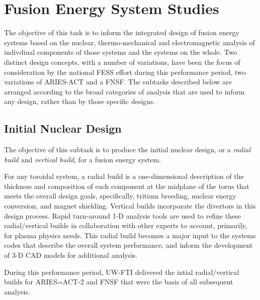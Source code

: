 \section{Fusion Energy System Studies}

The objective of this task is to inform the integrated design of fusion energy
systems based on the nuclear, thermo-mechanical and electromagnetic analysis
of indivdiual components of those systems and the systems on the whole.  Two
distinct design concepts, with a number of variations, have been the focus of
consideration by the national \gls{FESS} effort during this performance
period, two variations of ARIES-ACT and a \gls{FNSF}.  The subtasks described
below are arranged according to the broad categories of analysis that are used
to inform any design, rather than by those specific designs.

\subsection{Initial Nuclear Design}

The objective of this subtask is to produce the initial nuclear design, or a
\emph{radial build} and \emph{vertical build}, for a fusion energy system.

For any toroidal system, a radial build is a one-dimensional description of
the thickness and composition of each component at the midplane of the torus
that meets the overall design goals, specifically, tritium breeding, nuclear
energy conversion, and magnet shielding.  Vertical builds incorporate the
divertors in this design process.  Rapid turn-around 1-D analysis tools are
used to refine these radial/vertical builds in collaboration with other
experts to account, primarily, for plasma physics needs.  This radial build
becomes a major input to the systems codes that describe the overall system
performance, and inform the development of 3-D CAD models for additional
analysis.

During this performance period, \gls{UW-FTI} delivered the intial
radial/vertical builds for ARIES=ACT-2 and \gls{FNSF} that were the basis of
all subsequent analysis.

